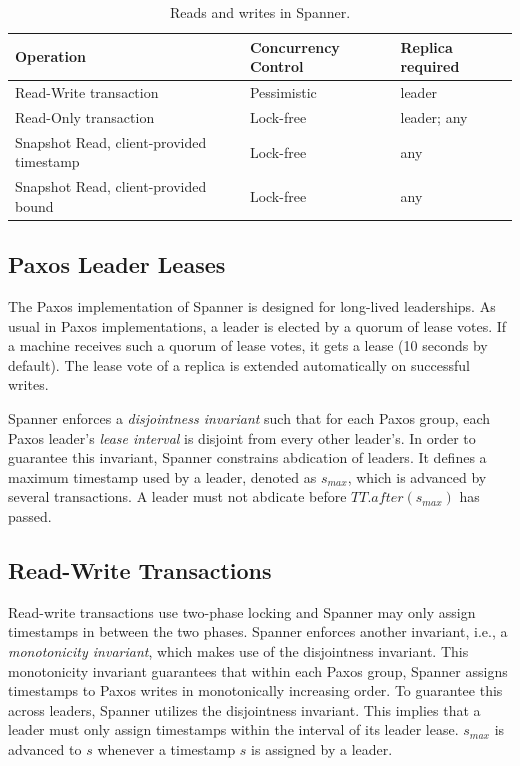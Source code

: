 \documentclass[onecolumn, a4paper, 10pt]{article}
\begin{document}
\begin{table}
  \centering
  \begin{tabular}{|l||l|l|}
    \hline
    {\bfseries Operation} & {\bfseries Concurrency Control} &
    {\bfseries Replica required} \tabularnewline
    \hline\hline
    Read-Write transaction & Pessimistic & leader \tabularnewline
    \hline
    Read-Only transaction & Lock-free & leader; any
    \tabularnewline
    \hline
    Snapshot Read, client-provided timestamp & Lock-free & any \tabularnewline
    \hline
    Snapshot Read, client-provided bound & Lock-free & any \tabularnewline
    \hline
  \end{tabular}
  \caption{Reads and writes in Spanner.}
  \label{tbl:reads-writes}
\end{table}

\subsection{Paxos Leader Leases}
\label{subsec:paxos-leader-leases}

The Paxos implementation of Spanner is designed for long-lived leaderships. As
usual in Paxos implementations, a leader is elected by a quorum of lease votes.
If a machine receives such a quorum of lease votes, it gets a lease (10 seconds
by default). The lease vote of a replica is extended automatically on successful
writes.

Spanner enforces a \emph{disjointness invariant} such that for each Paxos group,
each Paxos leader's \emph{lease interval} is disjoint from every other leader's.
In order to guarantee this invariant, Spanner constrains abdication of leaders.
It defines a maximum timestamp used by a leader, denoted as $s_{max}$, which is
advanced by several transactions. A leader must not abdicate before
$TT.after\left(s_{max}\right)$ has passed.

\subsection{Read-Write Transactions}
\label{subsec:read-write-transactions}

Read-write transactions use two-phase locking and Spanner may only assign
timestamps in between the two phases. Spanner enforces another invariant, i.e.,
a \emph{monotonicity invariant}, which makes use of the disjointness invariant.
This monotonicity invariant guarantees that within each Paxos group, Spanner
assigns timestamps to Paxos writes in monotonically increasing order. To guarantee
this across leaders, Spanner utilizes the disjointness invariant. This implies
that a leader must only assign timestamps within the interval of its leader
lease. $s_{max}$ is advanced to $s$ whenever a timestamp $s$ is assigned by a
leader.
\end{document}
